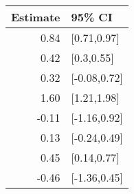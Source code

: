 \begin{tabular}{rl}
  \hline
Estimate & 95\% CI \\ 
  \hline
0.84 & [0.71,0.97] \\ 
  0.42 & [0.3,0.55] \\ 
  0.32 & [-0.08,0.72] \\ 
  1.60 & [1.21,1.98] \\ 
  -0.11 & [-1.16,0.92] \\ 
  0.13 & [-0.24,0.49] \\ 
  0.45 & [0.14,0.77] \\ 
  -0.46 & [-1.36,0.45] \\ 
   \hline
\end{tabular}

